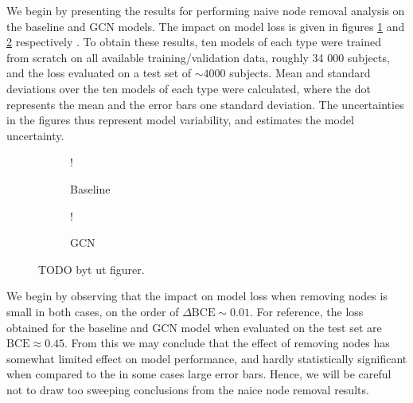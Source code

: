 We begin by presenting the results for performing naive node removal analysis on the baseline and GCN models. The impact on model loss is given in figures \ref{fig:naive_sex_baseline} and \ref{fig:naive_sex_gcn} respectively . To obtain these results, ten models of each type were trained from scratch on all available training/validation data, roughly 34 000 subjects, and the loss evaluated on a test set of $\sim4000$ subjects. Mean and standard deviations over the ten models of each type were calculated, where the dot represents the mean and the error bars one standard deviation. The uncertainties in the figures thus represent model variability, and estimates the model uncertainty.

\begin{figure}[H]
    \centering
        \begin{subfigure}{.5\textwidth}
            \centering
            \begin{center}
                 {!} {
                    
                }
            \end{center}
            \caption{Baseline}
            \label{fig:naive_sex_baseline}
        \end{subfigure}%
        \begin{subfigure}{.5\textwidth}
            \centering
            \begin{center}
                 {!} {
                    
                }
            \end{center}
            \caption{GCN}
            \label{fig:naive_sex_gcn}
        \end{subfigure}
    \caption{TODO byt ut figurer.}
    \label{fig:naive_sex}
\end{figure}



We begin by observing that the impact on model loss when removing nodes is small in both cases, on the order of $\Delta \text{BCE} \sim 0.01$. For reference, the loss obtained for the baseline and GCN model when evaluated on the test set are $\text{BCE} \approx 0.45$. From this we may conclude that the effect of removing nodes has somewhat limited effect on model performance, and hardly statistically significant when compared to the in some cases large error bars. Hence, we will be careful not to draw too sweeping conclusions from the naice node removal results.

